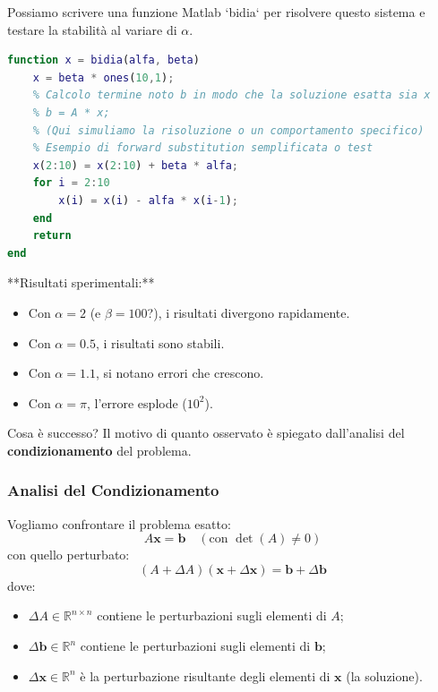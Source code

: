 Possiamo scrivere una funzione Matlab `bidia` per risolvere questo sistema e testare la stabilità al variare di $\alpha$.

\begin{lstlisting}[language=Matlab]
function x = bidia(alfa, beta)
    x = beta * ones(10,1);
    % Calcolo termine noto b in modo che la soluzione esatta sia x
    % b = A * x; 
    % (Qui simuliamo la risoluzione o un comportamento specifico)
    % Esempio di forward substitution semplificata o test
    x(2:10) = x(2:10) + beta * alfa; 
    for i = 2:10
        x(i) = x(i) - alfa * x(i-1);
    end
    return
end
\end{lstlisting}

**Risultati sperimentali:**
\begin{itemize}
    \item Con $\alpha=2$ (e $\beta=100$?), i risultati divergono rapidamente.
    \item Con $\alpha=0.5$, i risultati sono stabili.
    \item Con $\alpha=1.1$, si notano errori che crescono.
    \item Con $\alpha=\pi$, l'errore esplode ($10^2$).
\end{itemize}

Cosa è successo? Il motivo di quanto osservato è spiegato dall'analisi del \textbf{condizionamento} del problema.

\subsubsection{Analisi del Condizionamento}
Vogliamo confrontare il problema esatto:
\begin{equation} \label{eq:exact}
    A\mathbf{x} = \mathbf{b} \quad (\text{con } \det(A) \neq 0)
\end{equation}
con quello perturbato:
\begin{equation} \label{eq:perturbed}
    (A + \Delta A)(\mathbf{x} + \Delta \mathbf{x}) = \mathbf{b} + \Delta \mathbf{b}
\end{equation}
dove:
\begin{itemize}
    \item $\Delta A \in \mathbb{R}^{n \times n}$ contiene le perturbazioni sugli elementi di $A$;
    \item $\Delta \mathbf{b} \in \mathbb{R}^n$ contiene le perturbazioni sugli elementi di $\mathbf{b}$;
    \item $\Delta \mathbf{x} \in \mathbb{R}^n$ è la perturbazione risultante degli elementi di $\mathbf{x}$ (la soluzione).
\end{itemize}

